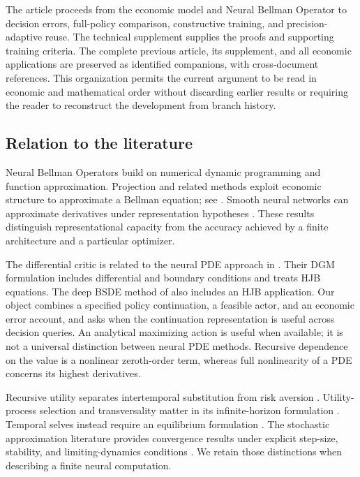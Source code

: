 \documentclass[ecta,nameyear,draft]{econsocart}
\theoremstyle{definition}
\theoremstyle{remark}
\begin{document}
The article proceeds from the economic model and Neural Bellman Operator
to decision errors, full-policy comparison, constructive training, and
precision-adaptive reuse. The technical supplement supplies the proofs and
supporting training criteria. The complete previous article, its supplement,
and all economic applications are preserved as identified companions, with
cross-document references. This organization permits the current argument
to be read in economic and mathematical order without discarding earlier
results or requiring the reader to reconstruct the development from branch
history.

\subsection{Relation to the literature}
Neural Bellman Operators build on numerical dynamic programming and function approximation. Projection and related methods exploit economic structure to approximate a Bellman equation; see \citet{judd1998}. Smooth neural networks can approximate derivatives under representation hypotheses \citep{hornik1990}. These results distinguish representational capacity from the accuracy achieved by a finite architecture and a particular optimizer.

The differential critic is related to the neural PDE approach in \citet{sirignano2018}. Their DGM formulation includes differential and boundary conditions and treats HJB equations. The deep BSDE method of \citet{han2018} also includes an HJB application. Our object combines a specified policy continuation, a feasible actor, and an economic error account, and asks when the continuation representation is useful across decision queries. An analytical maximizing action is useful when available; it is not a universal distinction between neural PDE methods. Recursive dependence on the value is a nonlinear zeroth-order term, whereas full nonlinearity of a PDE concerns its highest derivatives.

Recursive utility separates intertemporal substitution from risk aversion \citep{epsteinzin1989,duffieepstein1992}. Utility-process selection and transversality matter in its infinite-horizon formulation \citep{herdegen2021}. Temporal selves instead require an equilibrium formulation \citep{bjork2016}. The stochastic approximation literature provides convergence results under explicit step-size, stability, and limiting-dynamics conditions \citep{borkar2024}. We retain those distinctions when describing a finite neural computation.
\end{document}
